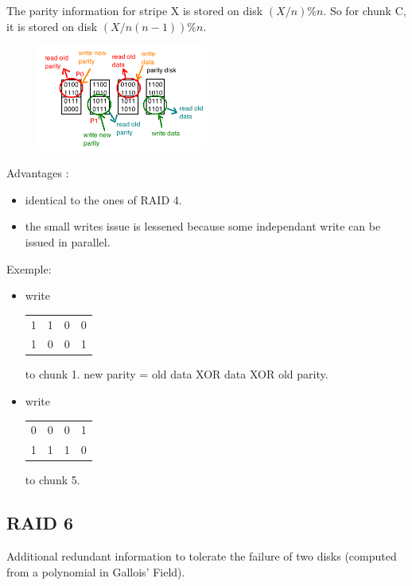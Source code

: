 The parity information for stripe X is stored on disk $(X/n)\%n$.
So for chunk C, it is stored on disk $(X/n(n-1))\%n$.

\begin{figure}[h!]
  \begin{center}
    \includegraphics[width=0.5\textwidth]{parity_disk_2.png}
  \end{center}
\end{figure}
\vspace{0.5cm}

Advantages :
\begin{itemize}
  \item identical to the ones of RAID 4.
  \item the small writes issue is lessened because some independant write can be issued in parallel.
\end{itemize}

Exemple:

\begin{itemize}
  \item write
      \begin{tabular}{|cccc|}
      \hline
         1&1&0&0 \\
         1&0&0&1 \\
      \end{tabular}
to chunk 1. new parity = old data XOR data XOR old parity.

\item write
      \begin{tabular}{|cccc|}
      \hline
         0&0&0&1 \\
         1&1&1&0 \\
      \hline
      \end{tabular}
to chunk 5. 
\end{itemize}

\subsection{RAID 6}

Additional redundant information to tolerate the failure of two disks (computed from a polynomial in Gallois' Field).

